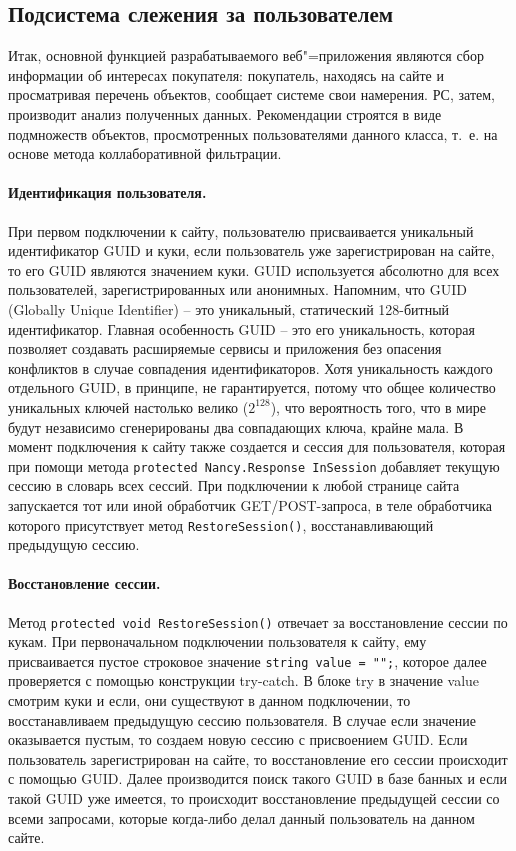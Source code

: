 \documentclass[a4paper,14pt,openany,final]{extreport} %
\begin{document}
{\subsection{Подсистема слежения за пользователем} %
Итак, основной функцией разрабатываемого веб"=приложения являются сбор информации об интересах покупателя: покупатель, находясь на сайте и просматривая перечень объектов, сообщает системе свои намерения. РС, затем, производит анализ полученных данных. Рекомендации строятся в виде подмножеств объектов, просмотренных пользователями данного класса, т.~е. на основе метода коллаборативной фильтрации.

\paragraph{Идентификация пользователя.}
При первом подключении к сайту, пользователю присваивается уникальный идентификатор GUID и куки, если пользователь уже зарегистрирован на сайте, то его GUID являются значением куки. GUID используется абсолютно для всех пользователей, зарегистрированных или анонимных. Напомним, что GUID (Globally Unique Identifier) -- это уникальный, статический 128-битный идентификатор. Главная особенность GUID – это его уникальность, которая позволяет создавать расширяемые сервисы и приложения без опасения конфликтов в случае совпадения идентификаторов. Хотя уникальность каждого отдельного GUID, в принципе, не гарантируется, потому что общее количество уникальных ключей настолько велико ($2^128$), что вероятность того, что в мире будут независимо сгенерированы два совпадающих ключа, крайне мала. В момент подключения к сайту также создается и сессия для пользователя, которая при помощи метода \verb|protected Nancy.Response InSession| добавляет текущую сессию в словарь всех сессий. При подключении к любой странице сайта запускается тот или иной обработчик GET/POST-запроса, в теле обработчика  которого присутствует метод \verb|RestoreSession()|, восстанавливающий предыдущую сессию.

\paragraph{Восстановление сессии.}
Метод \verb|protected void RestoreSession()| отвечает за восстановление сессии по кукам. При первоначальном подключении пользователя к сайту, ему присваивается пустое строковое значение \verb|string value = "";|, которое далее проверяется с помощью конструкции try-catch. В блоке try в значение value смотрим куки и если, они существуют в данном подключении, то восстанавливаем предыдущую сессию пользователя. В случае если значение оказывается пустым, то создаем новую сессию с присвоением GUID. Если пользователь зарегистрирован на сайте, то восстановление его сессии происходит с помощью GUID. Далее производится поиск такого GUID в базе банных и если такой GUID уже имеется, то происходит восстановление предыдущей сессии со всеми запросами, которые когда-либо делал данный пользователь на данном сайте.

}
\end{document}
